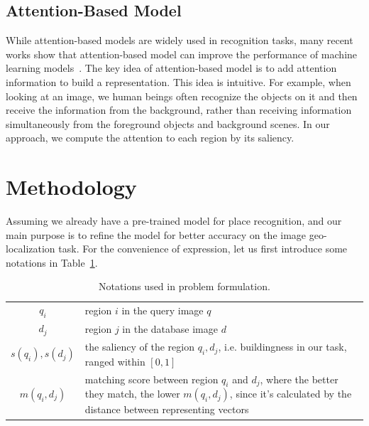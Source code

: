 \subsection{Attention-Based Model}
While attention-based models are widely used in recognition tasks, many recent works show that attention-based model can improve the performance of machine learning models~\cite{mnih2014recurrent, zheng2015neural}. The key idea of attention-based model is to add attention information to build a representation. This idea is intuitive. For example, when looking at an image, we human beings often recognize the objects on it and then receive the information from the background, rather than receiving information simultaneously from the foreground objects and background scenes. In our approach, we compute the attention to each region by its saliency. 



\section{Methodology}
Assuming we already have a pre-trained model for place recognition, and our main purpose is to refine the model for better accuracy on the image geo-localization task. For the convenience of expression, let us first introduce some notations in Table~\ref{table:notations}. 
\begin{table}[htbp]
\begin{center}
\begin{tabular}{|c|p{}|}
\hline
$q_i$ & region $i$ in the query image $q$\\[0.2cm]
$d_j$ & region $j$ in the database image $d$\\[0.2cm]
$s(q_i), s(d_j)$ & the saliency of the region $q_i, d_j$, i.e. buildingness in our
task, ranged within $[0,1]$ \\[0.2cm]
$m(q_i, d_j)$ & matching score between region $q_i$ and $d_j$, where the better they match, the lower $m(q_i,d_j)$, since it's calculated by the distance between representing vectors\\[0.2cm]
\hline
\end{tabular}
\end{center}
\caption{Notations used in problem formulation.}
\label{table:notations}
\end{table}
